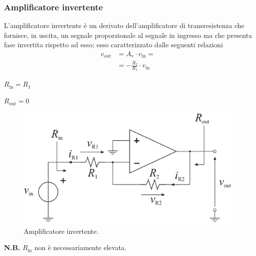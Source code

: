 \documentclass[a4paper]{article}
\begin{document}
				\subsubsection{Amplificatore invertente}
					L'amplificatore invertente è un derivato dell'amplificatore di transresistenza che fornisce, in uscita, un segnale proporzionale al segnale in ingresso ma che presenta fase invertita rispetto ad esso; esso caratterizzato dalle seguenti relazioni
					\begin{equation*}
						\begin{split}
							v_{\mathrm{out}} &= A_{\mathrm{v}} \cdot v_{\mathrm{in}} = \\
											 &= -\frac{R_{2}}{R_{1}} \cdot v_{\mathrm{in}}
						\end{split}
					\end{equation*}
					\begin{center}
						$ R_{\mathrm{in}} = R_{1} $
					\end{center}
					\newline
					\begin{center}
						$ R_{\mathrm{out}} = 0 $
					\end{center}
					\newline
					\begin{figure}[h!]
						\centering
						\includegraphics[scale=0.7]{amplificatoreInvertente}
						\caption{Amplificatore invertente.}
						\label{fig:amplificatoreInvertente}
					\end{figure}
					\newline
					\begin{scriptsize}
						\textbf{N.B.} $ R_{\mathrm{in}} $ non è necessariamente elevata. 
					\end{scriptsize}
\end{document}
